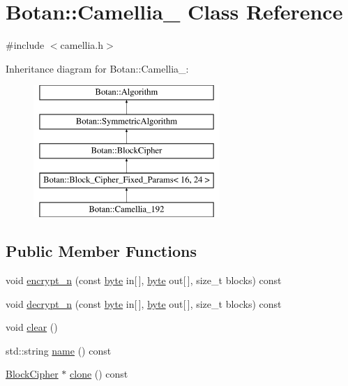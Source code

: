\hypertarget{classBotan_1_1Camellia__192}{\section{Botan\-:\-:Camellia\-\_ Class Reference}
\label{classBotan_1_1Camellia__192}
}


{\ttfamily \#include $<$camellia.\-h$>$}

Inheritance diagram for Botan\-:\-:Camellia\-\_\-:\begin{figure}[H]
\begin{center}
\leavevmode
\includegraphics[height=5.000000cm]{classBotan_1_1Camellia__192}
\end{center}
\end{figure}
\subsection*{Public Member Functions}
\begin{DoxyCompactItemize}
\item 
void \hyperlink{classBotan_1_1Camellia__192_a3ec67351f6bbccc2fde291220a61050d}{encrypt\-\_\-n} (const \hyperlink{namespaceBotan_a7d793989d801281df48c6b19616b8b84}{byte} in\mbox{[}$\,$\mbox{]}, \hyperlink{namespaceBotan_a7d793989d801281df48c6b19616b8b84}{byte} out\mbox{[}$\,$\mbox{]}, size\-\_\-t blocks) const 
\item 
void \hyperlink{classBotan_1_1Camellia__192_a291663b332ede2aaa75c96f0f08cbbad}{decrypt\-\_\-n} (const \hyperlink{namespaceBotan_a7d793989d801281df48c6b19616b8b84}{byte} in\mbox{[}$\,$\mbox{]}, \hyperlink{namespaceBotan_a7d793989d801281df48c6b19616b8b84}{byte} out\mbox{[}$\,$\mbox{]}, size\-\_\-t blocks) const 
\item 
void \hyperlink{classBotan_1_1Camellia__192_a13e56c747e1d81b20da488d34a88d8ce}{clear} ()
\item 
std\-::string \hyperlink{classBotan_1_1Camellia__192_a2f7c479d54dc250dd0229decc2625f8e}{name} () const 
\item 
\hyperlink{classBotan_1_1BlockCipher}{Block\-Cipher} $\ast$ \hyperlink{classBotan_1_1Camellia__192_a0afda0e82f49a11377be6e1468fe5efa}{clone} () const 
\end{DoxyCompactItemize}

